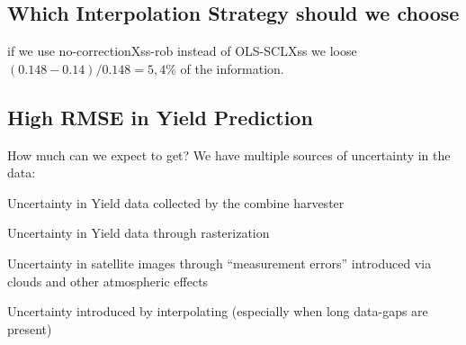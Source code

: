 {    \subsection{Which Interpolation Strategy should we choose}\label{sec:discussion_iplfstrategy-choose}
        if we use no-correctionXss-rob instead of OLS-SCLXss we loose $(0.148-0.14)/0.148 = 5,4\%$ of the information.
    \subsection{High RMSE in Yield Prediction}{\label{sec:discuss_high-rmse-in-yield-prdiction}
        How much can we expect to get? We have multiple sources of uncertainty in the data:
        \begin{Nenumerate}
            \item Uncertainty in Yield data collected by the combine harvester
            \item Uncertainty in Yield data through rasterization
            \item Uncertainty in satellite images through ``measurement errors'' introduced via clouds and other atmospheric effects 
            \item Uncertainty introduced by interpolating (especially when long data-gaps are present)
        \end{Nenumerate}
    }
}

